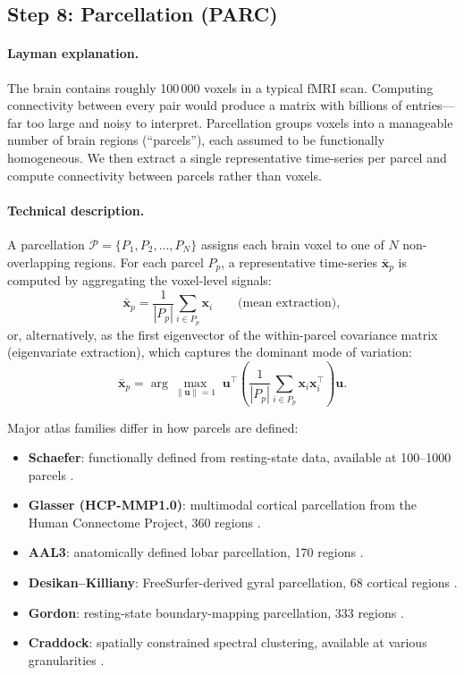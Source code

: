 \documentclass[11pt,a4paper]{article}
\begin{document}
\subsection{Step 8: Parcellation (PARC)}
\label{app:parc}

\paragraph{Layman explanation.}
The brain contains roughly 100\,000 voxels in a typical fMRI scan.  Computing connectivity between every pair would produce a matrix with billions of entries---far too large and noisy to interpret.  Parcellation groups voxels into a manageable number of brain regions (``parcels''), each assumed to be functionally homogeneous.  We then extract a single representative time-series per parcel and compute connectivity between parcels rather than voxels.

\paragraph{Technical description.}
A parcellation $\mathcal{P} = \{P_1, P_2, \ldots, P_N\}$ assigns each brain voxel to one of $N$ non-overlapping regions.  For each parcel $P_p$, a representative time-series $\bar{\mathbf{x}}_p$ is computed by aggregating the voxel-level signals:
\begin{equation}
    \bar{\mathbf{x}}_p = \frac{1}{|P_p|} \sum_{i \in P_p} \mathbf{x}_i \qquad \text{(mean extraction)},
\end{equation}
or, alternatively, as the first eigenvector of the within-parcel covariance matrix (eigenvariate extraction), which captures the dominant mode of variation:
\begin{equation}
    \bar{\mathbf{x}}_p = \arg\max_{\|\mathbf{u}\|=1} \; \mathbf{u}^\top \!\left(\frac{1}{|P_p|}\sum_{i \in P_p} \mathbf{x}_i \mathbf{x}_i^\top\right) \mathbf{u}.
\end{equation}

Major atlas families differ in how parcels are defined:
\begin{itemize}
    \item \textbf{Schaefer}: functionally defined from resting-state data, available at 100--1000 parcels \citep{schaefer2018}.
    \item \textbf{Glasser (HCP-MMP1.0)}: multimodal cortical parcellation from the Human Connectome Project, 360 regions \citep{glasser2016}.
    \item \textbf{AAL3}: anatomically defined lobar parcellation, 170 regions \citep{rolls2020}.
    \item \textbf{Desikan--Killiany}: FreeSurfer-derived gyral parcellation, 68 cortical regions \citep{desikan2006}.
    \item \textbf{Gordon}: resting-state boundary-mapping parcellation, 333 regions \citep{gordon2016}.
    \item \textbf{Craddock}: spatially constrained spectral clustering, available at various granularities \citep{craddock2012}.
\end{itemize}
\end{document}
